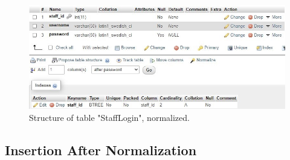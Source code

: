 \documentclass{article}
\begin{document}
		\begin{figure}[H]
			\includegraphics[width=\textwidth]{table_stafflogin_nstruct}
			\caption{Structure of table "Staff\textunderscore Login", normalized.}
		\end{figure}

	\subsection{Insertion After Normalization}
\end{document}
